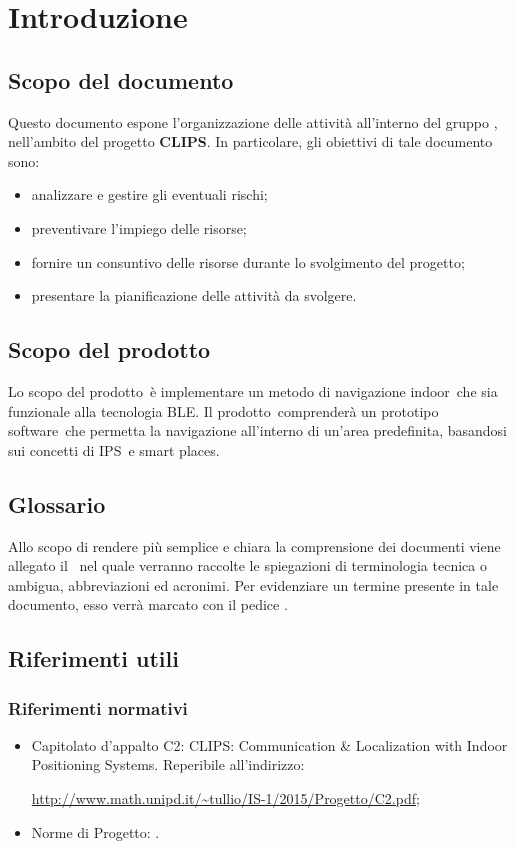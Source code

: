 \documentclass[../PianoProgetto.tex]{subfiles}
\begin{document}
\section{Introduzione}
	\subsection{Scopo del documento}
	Questo documento espone l'organizzazione delle attività all'interno del gruppo \leaf, nell'ambito del progetto \textbf{CLIPS}.
In particolare, gli obiettivi di tale documento sono:
	\begin{itemize}
	\item analizzare e gestire gli eventuali rischi;
	\item preventivare l'impiego delle risorse;
	\item fornire un consuntivo delle risorse durante lo svolgimento del progetto;
	\item presentare la pianificazione delle attività da svolgere.
	\end{itemize}
	
	\subsection{Scopo del prodotto}
	Lo scopo del prodotto\g\ è implementare un metodo di navigazione indoor\g\ che sia funzionale alla tecnologia BLE\g .
	Il prodotto\g\ comprenderà un prototipo software\g\ che permetta la navigazione all'interno di un'area predefinita, basandosi sui concetti di IPS\g\ e smart places\g.

	\subsection{Glossario}
		Allo scopo di rendere più semplice e chiara la comprensione dei documenti
viene allegato il \glossariov\ nel quale verranno raccolte le spiegazioni di
terminologia tecnica o ambigua, abbreviazioni ed acronimi. Per evidenziare
un termine presente in tale documento, esso verrà marcato con il pedice \g.


	\subsection{Riferimenti utili}

		\subsubsection{Riferimenti normativi}
		\begin{itemize}
		\item Capitolato d'appalto C2: CLIPS: Communication \& Localization with Indoor Positioning Systems. Reperibile all'indirizzo: \par
			\url{http://www.math.unipd.it/~tullio/IS-1/2015/Progetto/C2.pdf};
		\item Norme di Progetto: \normediprogettov.
		\end{itemize}
\end{document}
